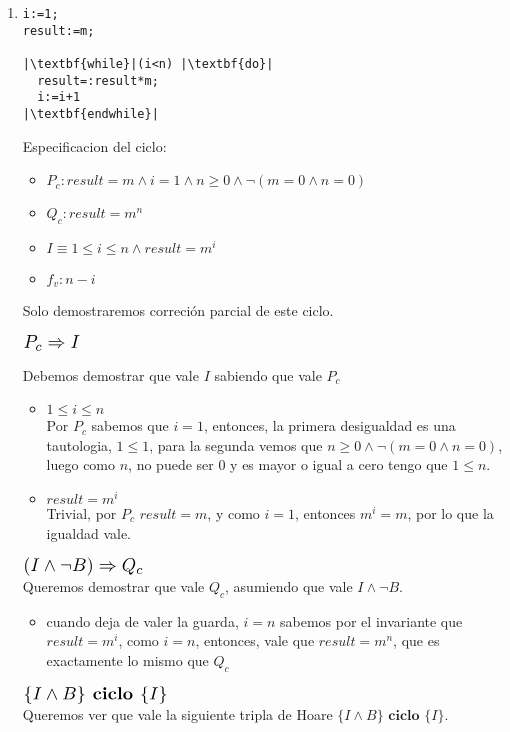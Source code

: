\documentclass{article}
\begin{document}
\noindent
\begin{enumerate}[label=\alph*)]
	\item 

\begin{lstlisting}
i:=1;
result:=m;

|\textbf{while}|(i<n) |\textbf{do}|
  result=:result*m;
  i:=i+1
|\textbf{endwhile}|
\end{lstlisting}

 Especificacion del ciclo:
	\begin{itemize}
		\item $P_c: result=m \wedge i=1\wedge n\geq 0 \wedge \neg(m=0\wedge n=0)$
		\item $Q_c:result=m^n$
		\item $I\equiv 1\leq i\leq n \wedge result=m^i$
		\item $f_v:n-i$
	\end{itemize}
	Solo demostraremos correción parcial de este ciclo.
	\begin{flushleft}$\scalebox{1.3}{$P_c\Rightarrow I$}$\end{flushleft}
	Debemos demostrar que vale $I$ sabiendo que vale $P_c$ 
	\begin{itemize}
		\item $ 1\leq i\leq n$\smallskip \\
		Por $P_c$ sabemos que $i=1$, entonces, la primera desigualdad es una tautologia,
		$1\leq 1$, para la segunda vemos que $n\geq0\wedge \neg(m=0 \wedge n=0)$, luego como 
		$n$, no puede ser 0 y es mayor o igual a cero tengo que $1\leq n$.
		\item  $result=m^i$\\
		Trivial, por $P_c$ $result=m$, y como $i=1$, entonces $m^i=m$, por lo que 
		 la igualdad vale.  
	\end{itemize}	 
	$\scalebox{1.3}{$(I\wedge \neg B)\Rightarrow Q_c$}$\smallskip \\
	Queremos demostrar que vale $Q_c$, asumiendo que vale  $I\wedge \neg B$.
	\begin{itemize}
	\item cuando deja de valer la guarda, $i=n$ sabemos por el invariante que $result=m^i$, como $i=n$, entonces,
	vale que $result=m^n$, que es exactamente lo mismo que $Q_c$
	\end{itemize}
	$\scalebox{1.3}{$\{I\wedge B\} \textbf{ ciclo } \{I\}$}$\medskip \\
	Queremos ver que vale la siguiente tripla de Hoare $\{I\wedge B\} \textbf{ ciclo } \{I\}$.\\

\end{enumerate}
\end{document}

